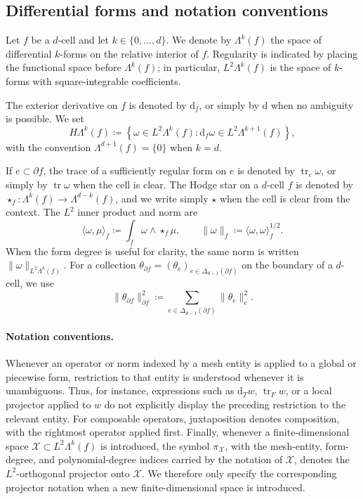 \documentclass[a4paper,11pt]{article}
\theoremstyle{definition}
\newcommand{\DIFF}{\mathrm{d}}
\newcommand{\FM}[1]{\Delta_{#1}}
\newcommand{\trc}{\operatorname{tr}}
\begin{document}
\subsection{Differential forms and notation conventions}
\label{sec:setting:forms}

Let $f$ be a $d$-cell and let $k\in\{0,\ldots,d\}$.
We denote by $\Lambda^k(f)$ the space of differential $k$-forms on the relative interior of $f$.
Regularity is indicated by placing the functional space before $\Lambda^k(f)$; in particular, $L^2\Lambda^k(f)$ is the space of $k$-forms with square-integrable coefficients.

The exterior derivative on $f$ is denoted by $\DIFF_f$, or simply by $\DIFF$ when no ambiguity is possible.
We set
\[
  H\Lambda^k(f)
  \coloneqq
  \left\{
    \omega\in L^2\Lambda^k(f):
    \DIFF_f\omega\in L^2\Lambda^{k+1}(f)
  \right\},
\]
with the convention $\Lambda^{d+1}(f)=\{0\}$ when $k=d$.

If $e\subset\partial f$, the trace of a sufficiently regular form on $e$ is denoted by $\trc_e\omega$, or simply by $\trc\omega$ when the cell is clear.
The Hodge star on a $d$-cell $f$ is denoted by $\star_f:\Lambda^k(f)\longrightarrow\Lambda^{d-k}(f)$, and we write simply $\star$ when the cell is clear from the context.
The $L^2$ inner product and norm are
\[
  \langle\omega,\mu\rangle_f
  \coloneqq
  \int_f\omega\wedge\star_f\mu,
  \qquad
  \|\omega\|_f
  \coloneqq
  \langle\omega,\omega\rangle_f^{1/2}.
\]
When the form degree is useful for clarity, the same norm is written $\|\omega\|_{L^2\Lambda^k(f)}$.
For a collection $\theta_{\partial f}=(\theta_e)_{e\in\FM{d-1}(\partial f)}$ on the boundary of a $d$-cell, we use
\[
  \|\theta_{\partial f}\|_{\partial f}^2
  \coloneqq
  \sum_{e\in\FM{d-1}(\partial f)}\|\theta_e\|_e^2.
\]

\paragraph*{Notation conventions.}
Whenever an operator or norm indexed by a mesh entity is applied to a global or piecewise form, restriction to that entity is understood whenever it is unambiguous.
Thus, for instance, expressions such as $\DIFF_Tw$, $\trc_Fw$, or a local projector applied to $w$ do not explicitly display the preceding restriction to the relevant entity.
For composable operators, juxtaposition denotes composition, with the rightmost operator applied first.
Finally, whenever a finite-dimensional space $\mathcal X\subset L^2\Lambda^k(f)$ is introduced, the symbol $\pi_{\mathcal X}$, with the mesh-entity, form-degree, and polynomial-degree indices carried by the notation of $\mathcal X$, denotes the $L^2$-orthogonal projector onto $\mathcal X$.
We therefore only specify the corresponding projector notation when a new finite-dimensional space is introduced.
\end{document}
